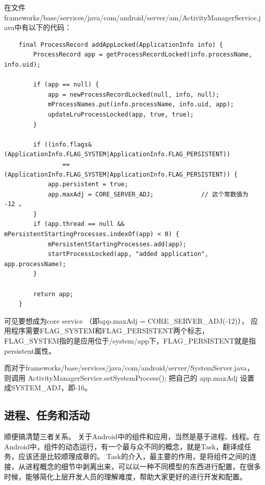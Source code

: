 \documentclass[a4paper, 11pt]{article}
\begin{document}
在文件frameworks/base/services/java/com/android/server/am/ActivityManagerService.java中有以下的代码：
\begin{lstlisting}
    final ProcessRecord addAppLocked(ApplicationInfo info) {
        ProcessRecord app = getProcessRecordLocked(info.processName, info.uid);

        if (app == null) {
            app = newProcessRecordLocked(null, info, null);
            mProcessNames.put(info.processName, info.uid, app);
            updateLruProcessLocked(app, true, true);
        }    

        if ((info.flags&(ApplicationInfo.FLAG_SYSTEM|ApplicationInfo.FLAG_PERSISTENT))
                == (ApplicationInfo.FLAG_SYSTEM|ApplicationInfo.FLAG_PERSISTENT)) {
            app.persistent = true;
            app.maxAdj = CORE_SERVER_ADJ;             // 这个常数值为 -12 。
        }    
        if (app.thread == null && mPersistentStartingProcesses.indexOf(app) < 0) {
            mPersistentStartingProcesses.add(app);
            startProcessLocked(app, "added application", app.processName);
        }    

        return app;
    }
\end{lstlisting}

可见要想成为core service （即app.maxAdj = CORE_SERVER_ADJ(-12)），
应用程序需要FLAG_SYSTEM和FLAG_PERSISTENT两个标志，
FLAG_SYSTEM指的是应用位于/system/app下，FLAG_PERSISTENT就是指persistent属性。

而对于frameworks/base/services/java/com/android/server/SystemServer.java，则调用
       ActivityManagerService.setSystemProcess();
把自己的 app.maxAdj 设置成SYSTEM_ADJ，即-16。

\subsection{进程、任务和活动}
顺便搞清楚三者关系。
关于Android中的组件和应用，当然是基于进程、线程。在Android中，组件的动态运行，有一个最与众不同的概念，就是Task，翻译成任务，应该还是比较顺理成章的。
Task的介入，最主要的作用，是将组件之间的连接，从进程概念的细节中剥离出来，可以以一种不同模型的东西进行配置，在很多时候，能够简化上层开发人员的理解难度，帮助大家更好的进行开发和配置。
\end{document}

